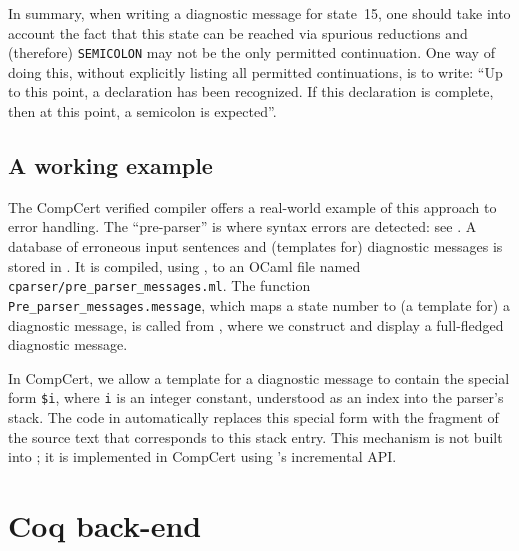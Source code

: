 \documentclass[onecolumn,11pt,nocopyrightspace,preprint]{sigplanconf}
\begin{document}
In summary, when writing a diagnostic message for state~15, one should take
into account the fact that this state can be reached via spurious reductions
and (therefore) \verb+SEMICOLON+ may not be the only permitted continuation.
One way of doing this, without explicitly listing all permitted continuations,
is to write: ``Up to this point, a declaration has been recognized. If this
declaration is complete, then at this point, a semicolon is expected''.


\subsection{A working example}
\label{sec:errors:example}

The CompCert verified compiler offers a real-world example of this approach to
error handling. The ``pre-parser'' is where syntax errors are detected: see
.
A database of erroneous input sentences and (templates for) diagnostic messages is stored in
. It is compiled, using \ocompileerrors,
to an OCaml file named \texttt{cparser/pre\_parser\_messages.ml}. The
function \verb+Pre_parser_messages.message+, which maps a state number to (a template for) a
diagnostic message, is called from
,
where we construct and display a full-fledged diagnostic message.

In CompCert, we allow a template for a diagnostic message to contain the
special form \verb+$i+, where \verb+i+ is an integer constant, understood as
an index into the parser's stack. The code
in  automatically replaces this
special form with the fragment of the source text that corresponds to this
stack entry. This mechanism is not built into \menhir; it is implemented in
CompCert using \menhir's incremental API.


\section{Coq back-end}
\label{sec:coq}
\end{document}
